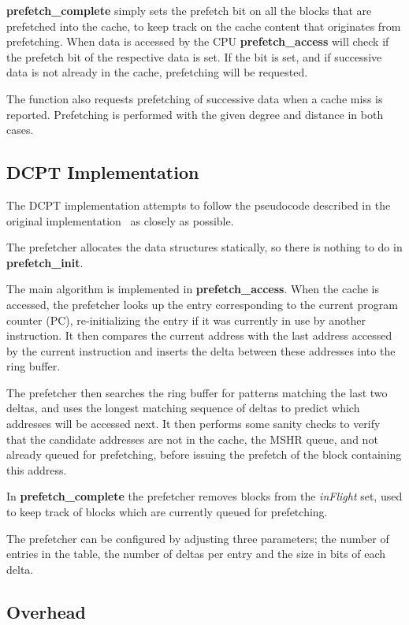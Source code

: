 \textbf{prefetch\_complete} simply sets the prefetch bit on all the blocks that
are prefetched into the cache, to keep track on the cache content that
originates from prefetching. When data is accessed by the CPU
\textbf{prefetch\_access} will check if the prefetch bit of the respective data
is set. If the bit is set, and if successive data is not already in the cache,
prefetching will be requested.

The function also requests prefetching of successive data when a cache miss is
reported. Prefetching is performed with the given degree and distance in both
cases.

\subsection{DCPT Implementation}

The DCPT implementation attempts to follow the pseudocode described in the
original implementation~\cite{dcpt} as closely as possible.

The prefetcher allocates the data structures statically, so there is nothing to do in \textbf{prefetch\_init}.

The main algorithm is implemented in \textbf{prefetch\_access}. When the cache
is accessed, the prefetcher looks up the entry corresponding to the current
program counter (PC), re-initializing the entry if it was currently in use by
another instruction. It then compares the current address with the last address
accessed by the current instruction and inserts the delta between these
addresses into the ring buffer.

The prefetcher then searches the ring buffer for patterns matching the last two
deltas, and uses the longest matching sequence of deltas to predict which
addresses will be accessed next. It then performs some sanity checks to verify
that the candidate addresses are not in the cache, the MSHR queue, and not
already queued for prefetching, before issuing the prefetch of the block
containing this address.

In \textbf{prefetch\_complete} the prefetcher removes blocks from the
\emph{inFlight} set, used to keep track of blocks which are currently queued for
prefetching.

The prefetcher can be configured by adjusting three parameters; the number of
entries in the table, the number of deltas per entry and the size in bits of
each delta.

\subsection{Overhead}

